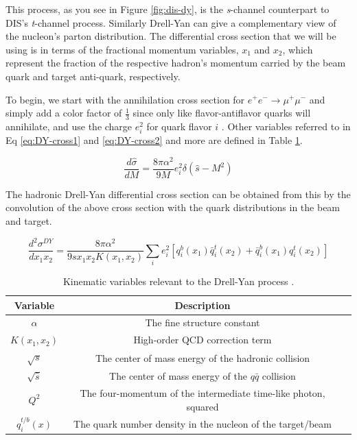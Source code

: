 This process, as you see in Figure \ref{fig:dis-dy}, is the \emph{s}-channel counterpart to DIS's \emph{t}-channel process.  Similarly Drell-Yan can give a complementary view of the nucleon's parton distribution. The differential cross section that we will be using is in terms of the fractional momentum variables, $x_1$ and $x_2$, which represent the fraction of the respective hadron's momentum carried by the beam quark and target anti-quark, respectively.

To begin, we start with the annihilation cross section for $e^+e^- \rightarrow \mu^+\mu^-$ and simply add a color factor of $\frac{1}{3}$ since only like flavor-antiflavor quarks will annihilate, and use the charge $e_i^2$ for quark flavor $i$ \cite{duan-2007-50}. Other variables referred to in Eq \ref{eq:DY-cross1} and \ref{eq:DY-cross2} and more are defined in Table \ref{tab:var}.

\begin{equation}
\frac{d\hat{\sigma}}{dM} = \frac{8 \pi \alpha^2}{9M}e_i^2\delta(\hat{s} - M^2)
\label{eq:DY-cross1}
\end{equation}

The hadronic Drell-Yan differential cross section can be obtained from this by the convolution of the above cross section with the quark distributions in the beam and target.

\begin{equation}
\frac{d^2\sigma^{DY}}{dx_1x_2}=\frac{8\pi\alpha^2}{9sx_1x_2 K(x_1,x_2)}
\sum_{i}e_i^2[q_i^b(x_1)\bar{q}_i^t(x_2)+
\bar{q}_i^b(x_1)q_i^t(x_2)]
\label{eq:DY-cross2}
\end{equation}

\begin{table}[h]
	\centering
	\begin{tabular}{ccl}
		Variable&Description\\ \hline \hline
		$\alpha$ & The fine structure constant \\
		$K(x_1,x_2)$ & High-order QCD correction term \\ \hline
		$\sqrt{s}$ & The center of mass energy of the hadronic collision \\
		$\sqrt{\hat{s}}$ & The center of mass energy of the $q\bar{q}$ collision \\
		$Q^{2}$ & The four-momentum of the intermediate time-like photon, squared \\ 
		$q_i^{t/b}(x)$ & The quark number density in the nucleon of the target/beam \\ \hline \hline
	\end{tabular}
	\caption{Kinematic variables relevant to the Drell-Yan process .}
	\label{tab:var}
\end{table}


